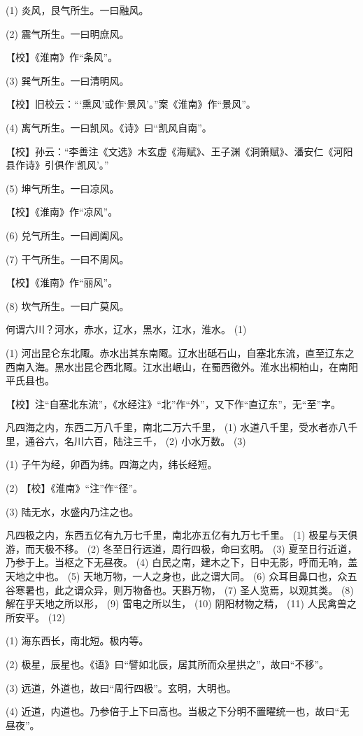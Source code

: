 \documentclass[12pt,UTF8]{ctexbook}
\begin{document}
(1) 炎风，艮气所生。一曰融风。

(2) 震气所生。一曰明庶风。

【校】《淮南》作“条风”。

(3) 巽气所生。一曰清明风。

【校】旧校云：“‘熏风’或作‘景风’。”案《淮南》作“景风”。

(4) 离气所生。一曰凯风。《诗》曰“凯风自南”。

【校】孙云：“李善注《文选》木玄虚《海赋》、王子渊《洞箫赋》、潘安仁《河阳县作诗》引俱作‘凯风’。”

(5) 坤气所生。一曰凉风。

【校】《淮南》作“凉风”。

(6) 兑气所生。一曰阊阖风。

(7) 干气所生。一曰不周风。

【校】《淮南》作“丽风”。

(8) 坎气所生。一曰广莫风。

何谓六川？河水，赤水，辽水，黑水，江水，淮水。 (1)

(1) 河出昆仑东北陬。赤水出其东南陬。辽水出砥石山，自塞北东流，直至辽东之西南入海。黑水出昆仑西北陬。江水出岷山，在蜀西徼外。淮水出桐柏山，在南阳平氏县也。

【校】注“自塞北东流”，《水经注》“北”作“外”，又下作“直辽东”，无“至”字。

凡四海之内，东西二万八千里，南北二万六千里， (1) 水道八千里，受水者亦八千里，通谷六，名川六百，陆注三千， (2) 小水万数。 (3)

(1) 子午为经，卯酉为纬。四海之内，纬长经短。

(2) 【校】《淮南》“注”作“径”。

(3) 陆无水，水盛内乃注之也。

凡四极之内，东西五亿有九万七千里，南北亦五亿有九万七千里。 (1) 极星与天俱游，而天极不移。 (2) 冬至日行远道，周行四极，命曰玄明。 (3) 夏至日行近道，乃参于上。当枢之下无昼夜。 (4) 白民之南，建木之下，日中无影，呼而无响，盖天地之中也。 (5) 天地万物，一人之身也，此之谓大同。 (6) 众耳目鼻口也，众五谷寒暑也，此之谓众异，则万物备也。天斟万物， (7) 圣人览焉，以观其类。 (8) 解在乎天地之所以形， (9) 雷电之所以生， (10) 阴阳材物之精， (11) 人民禽兽之所安平。 (12)

(1) 海东西长，南北短。极内等。

(2) 极星，辰星也。《语》曰“譬如北辰，居其所而众星拱之”，故曰“不移”。

(3) 远道，外道也，故曰“周行四极”。玄明，大明也。

(4) 近道，内道也。乃参倍于上下曰高也。当极之下分明不置曜统一也，故曰“无昼夜”。
\end{document}
